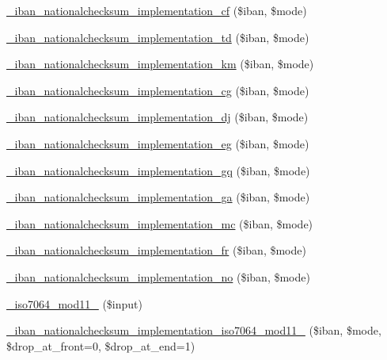 \begin{DoxyCompactItemize}
\hyperlink{classWEPPO_1_1Helpers_1_1IBAN_af11713145d1a50df5816007ebae7180f}{\+\_\+iban\+\_\+nationalchecksum\+\_\+implementation\+\_\+cf} (\$iban, \$mode)
\item 
\hyperlink{classWEPPO_1_1Helpers_1_1IBAN_a8a3b976c5b1ab1b11c286a37e542e4f3}{\+\_\+iban\+\_\+nationalchecksum\+\_\+implementation\+\_\+td} (\$iban, \$mode)
\item 
\hyperlink{classWEPPO_1_1Helpers_1_1IBAN_a10be8661fa08ad1243184b5140044f07}{\+\_\+iban\+\_\+nationalchecksum\+\_\+implementation\+\_\+km} (\$iban, \$mode)
\item 
\hyperlink{classWEPPO_1_1Helpers_1_1IBAN_a847f2602f55ea9eaf1686c6babe41393}{\+\_\+iban\+\_\+nationalchecksum\+\_\+implementation\+\_\+cg} (\$iban, \$mode)
\item 
\hyperlink{classWEPPO_1_1Helpers_1_1IBAN_a56f48baccd9e4259d5a0394073cee710}{\+\_\+iban\+\_\+nationalchecksum\+\_\+implementation\+\_\+dj} (\$iban, \$mode)
\item 
\hyperlink{classWEPPO_1_1Helpers_1_1IBAN_ac1d8d8d55dc3e6660567921c74b10dfd}{\+\_\+iban\+\_\+nationalchecksum\+\_\+implementation\+\_\+eg} (\$iban, \$mode)
\item 
\hyperlink{classWEPPO_1_1Helpers_1_1IBAN_a4d0b9eae6af46d36ca19b854717c9a9d}{\+\_\+iban\+\_\+nationalchecksum\+\_\+implementation\+\_\+gq} (\$iban, \$mode)
\item 
\hyperlink{classWEPPO_1_1Helpers_1_1IBAN_ab6987b2e12f320ec6e7598e41a47e2db}{\+\_\+iban\+\_\+nationalchecksum\+\_\+implementation\+\_\+ga} (\$iban, \$mode)
\item 
\hyperlink{classWEPPO_1_1Helpers_1_1IBAN_a46e119a6e21207878e19c85861414398}{\+\_\+iban\+\_\+nationalchecksum\+\_\+implementation\+\_\+mc} (\$iban, \$mode)
\item 
\hyperlink{classWEPPO_1_1Helpers_1_1IBAN_aea2c3a62cd4d74a7be2e0dec038b682e}{\+\_\+iban\+\_\+nationalchecksum\+\_\+implementation\+\_\+fr} (\$iban, \$mode)
\item 
\hyperlink{classWEPPO_1_1Helpers_1_1IBAN_a9b9dd82a323b3626f2ed65d9d8fcf78c}{\+\_\+iban\+\_\+nationalchecksum\+\_\+implementation\+\_\+no} (\$iban, \$mode)
\item 
\hyperlink{classWEPPO_1_1Helpers_1_1IBAN_a3091fa38b87e3f668dbc5acdcf4210a8}{\+\_\+iso7064\+\_\+mod11\+\_} (\$input)
\item 
\hyperlink{classWEPPO_1_1Helpers_1_1IBAN_a72042c09045cb77924c4fa80a7fb2250}{\+\_\+iban\+\_\+nationalchecksum\+\_\+implementation\+\_\+iso7064\+\_\+mod11\+\_} (\$iban, \$mode, \$drop\+\_\+at\+\_\+front=0, \$drop\+\_\+at\+\_\+end=1)

\end{DoxyCompactItemize}

